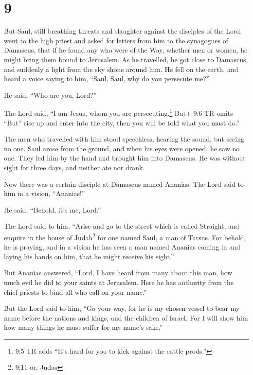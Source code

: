 \hypertarget{section-8}{%
\section{9}\label{section-8}}

 But Saul, still breathing threats and slaughter against the
disciples of the Lord, went to the high priest  and asked
for letters from him to the synagogues of Damascus, that if he found any
who were of the Way, whether men or women, he might bring them bound to
Jerusalem.  As he travelled, he got close to Damascus, and
suddenly a light from the sky shone around him.  He fell on
the earth, and heard a voice saying to him, ``Saul, Saul, why do you
persecute me?''

 He said, ``Who are you, Lord?''

The Lord said, ``I am Jesus, whom you are persecuting.\footnote{9:5 TR
  adds ``It's hard for you to kick against the cattle prods.''}
 But+ 9:6 TR omits ``But'' rise up and enter into the city,
then you will be told what you must do.''

 The men who travelled with him stood speechless, hearing
the sound, but seeing no one.  Saul arose from the ground,
and when his eyes were opened, he saw no one. They led him by the hand
and brought him into Damascus.  He was without sight for
three days, and neither ate nor drank.

 Now there was a certain disciple at Damascus named
Ananias. The Lord said to him in a vision, ``Ananias!''

He said, ``Behold, it's me, Lord.''

 The Lord said to him, ``Arise and go to the street which
is called Straight, and enquire in the house of Judah\footnote{9:11 or,
  Judas} for one named Saul, a man of Tarsus. For behold, he is praying,
 and in a vision he has seen a man named Ananias coming in
and laying his hands on him, that he might receive his sight.''

 But Ananias answered, ``Lord, I have heard from many about
this man, how much evil he did to your saints at Jerusalem.
 Here he has authority from the chief priests to bind all
who call on your name.''

 But the Lord said to him, ``Go your way, for he is my
chosen vessel to bear my name before the nations and kings, and the
children of Israel.  For I will show him how many things he
must suffer for my name's sake.''

